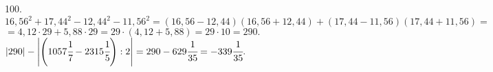 100. $16,56^2+17,44^2-12,44^2-11,56^2=(16,56-12,44)(16,56+12,44)+(17,44-11,56)(17,44+11,56)=$\\$=4,12\cdot29+5,88\cdot29=29\cdot(4,12+5,88)=29\cdot10=290.$\\
$|290|-\left |\left(1057\cfrac{1}{7}-2315\cfrac{1}{5}\right):2\right |=290-629\cfrac{1}{35}=-339\cfrac{1}{35}.$\\
